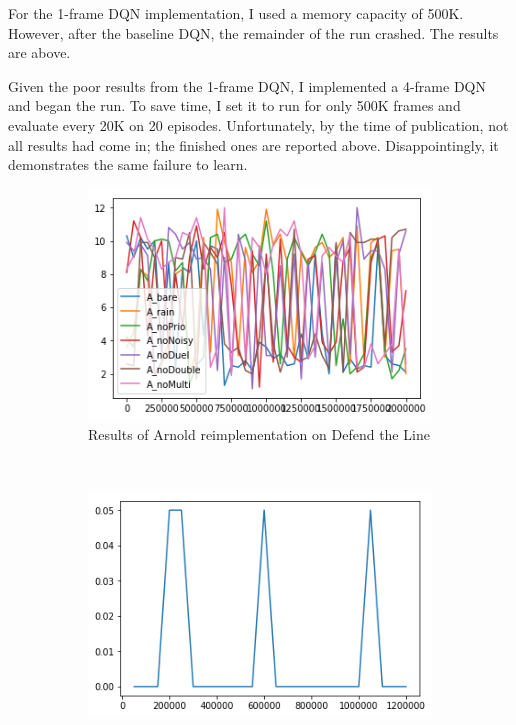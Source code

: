 \documentclass[letterpaper]{article}
\begin{document}
	For the 1-frame DQN implementation, I used a memory capacity of 500K. However, after the baseline DQN, the remainder of the run crashed. The results are above.
	
	Given the poor results from the 1-frame DQN, I implemented a 4-frame DQN and began the run. To save time, I set it to run for only 500K frames and evaluate every 20K on 20 episodes. Unfortunately, by the time of publication, not all results had come in; the finished ones are reported above. Disappointingly, it demonstrates the same failure to learn.
	
	\begin{figure}
		\centering
		\begin{subfigure}[b]{0.3\textwidth}
			\includegraphics[width=\textwidth]{ArnoldResults}
			\caption{Results of Arnold reimplementation on Defend the Line}
			\label{fig:ArnoldResults}
		\end{subfigure}
		~ %
		\begin{subfigure}[b]{0.3\textwidth}
			\includegraphics[width=\textwidth]{DQN1Results}

\end{subfigure}
\end{figure}
\end{document}
